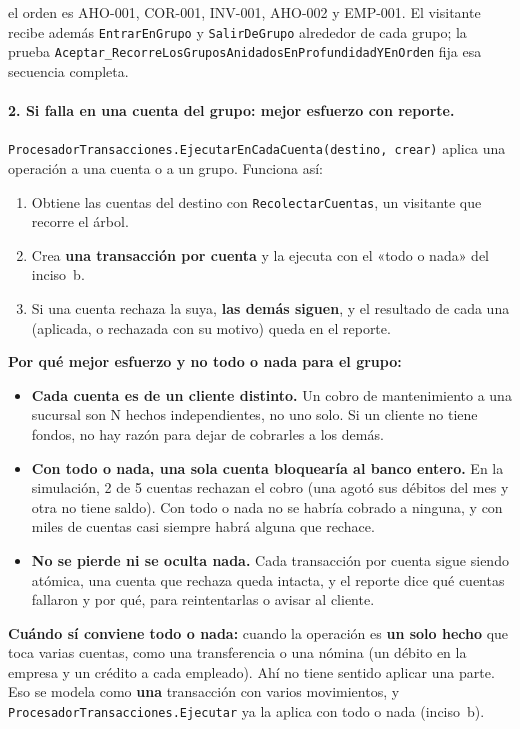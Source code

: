 el orden es AHO-001, COR-001, INV-001, AHO-002 y EMP-001. El visitante recibe además
\texttt{EntrarEnGrupo} y \texttt{SalirDeGrupo} alrededor de cada grupo; la prueba
\texttt{Aceptar\_\allowbreak{}RecorreLosGruposAnidados\allowbreak{}EnProfundidadYEnOrden} fija esa secuencia completa.

\paragraph{2. Si falla en una cuenta del grupo: mejor esfuerzo con reporte.}
\texttt{ProcesadorTransacciones.\allowbreak{}EjecutarEnCadaCuenta(\allowbreak{}destino, crear)} aplica una operación a
una cuenta o a un grupo. Funciona así:
\begin{enumerate}
  \item Obtiene las cuentas del destino con \texttt{RecolectarCuentas}, un visitante que
        recorre el árbol.
  \item Crea \textbf{una transacción por cuenta} y la ejecuta con el «todo o nada» del
        inciso~b.
  \item Si una cuenta rechaza la suya, \textbf{las demás siguen}, y el resultado de cada una
        (aplicada, o rechazada con su motivo) queda en el reporte.
\end{enumerate}

\textbf{Por qué mejor esfuerzo y no todo o nada para el grupo:}
\begin{itemize}
  \item \textbf{Cada cuenta es de un cliente distinto.} Un cobro de mantenimiento a una
        sucursal son N hechos independientes, no uno solo. Si un cliente no tiene fondos, no
        hay razón para dejar de cobrarles a los demás.
  \item \textbf{Con todo o nada, una sola cuenta bloquearía al banco entero.} En la
        simulación, 2 de 5 cuentas rechazan el cobro (una agotó sus débitos del mes y otra no
        tiene saldo). Con todo o nada no se habría cobrado a ninguna, y con miles de cuentas
        casi siempre habrá alguna que rechace.
  \item \textbf{No se pierde ni se oculta nada.} Cada transacción por cuenta sigue siendo
        atómica, una cuenta que rechaza queda intacta, y el reporte dice qué cuentas fallaron
        y por qué, para reintentarlas o avisar al cliente.
\end{itemize}

\textbf{Cuándo sí conviene todo o nada:} cuando la operación es \textbf{un solo hecho} que
toca varias cuentas, como una transferencia o una nómina (un débito en la empresa y un crédito
a cada empleado). Ahí no tiene sentido aplicar una parte. Eso se modela como \textbf{una}
transacción con varios movimientos, y \texttt{ProcesadorTransacciones.Ejecutar} ya la aplica
con todo o nada (inciso~b).

